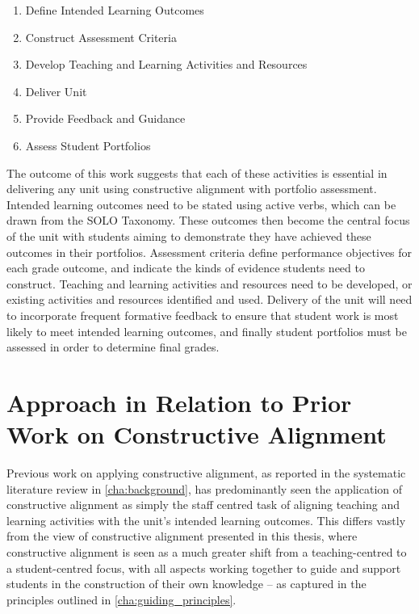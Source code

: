 \begin{enumerate}
	\item Define Intended Learning Outcomes
	\item Construct Assessment Criteria
	\item Develop Teaching and Learning Activities and Resources
	\item Deliver Unit
	\item Provide Feedback and Guidance
	\item Assess Student Portfolios
\end{enumerate}

The outcome of this work suggests that each of these activities is essential in delivering any unit using constructive alignment with portfolio assessment. Intended learning outcomes need to be stated using active verbs, which can be drawn from the SOLO Taxonomy. These outcomes then become the central focus of the unit with students aiming to demonstrate they have achieved these outcomes in their portfolios. Assessment criteria define performance objectives for each grade outcome, and indicate the kinds of evidence students need to construct. Teaching and learning activities and resources need to be developed, or existing activities and resources identified and used. Delivery of the unit will need to incorporate frequent formative feedback to ensure that student work is most likely to meet intended learning outcomes, and finally student portfolios must be assessed in order to determine final grades. 



\section{Approach in Relation to Prior Work on Constructive Alignment} %
\label{sec:approach_in_relation_to_previous_work}

Previous work on applying constructive alignment, as reported in the systematic literature review in \cref{cha:background}, has predominantly seen the application of constructive alignment as simply the staff centred task of aligning teaching and learning activities with the unit's intended learning outcomes. This differs vastly from the view of constructive alignment presented in this thesis, where constructive alignment is seen as a much greater shift from a teaching-centred to a student-centred focus, with all aspects working together to guide and support students in the construction of their own knowledge -- as captured in the principles outlined in \cref{cha:guiding_principles}.

